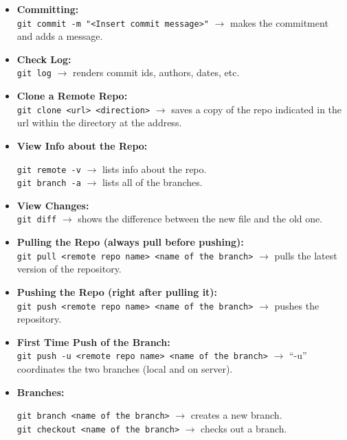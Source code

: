 \documentclass{article}
\begin{document}
\begin{itemize}
    	\item \textbf{Committing:}\\
    	    {\tt git commit -m "<Insert commit message>"} $\rightarrow$ makes the commitment and adds a message.
    	
    	\item \textbf{Check Log:}\\
    	    {\tt git log} $\rightarrow$ renders commit ids, authors, dates, etc.
    	    
    	\item \textbf{Clone a Remote Repo:}\\
    	    {\tt git clone <url> <direction>} $\rightarrow$ saves a copy of the repo indicated in the url within the directory at the address.
    	    
    	\item \textbf{View Info about the Repo:}\\
    	    \begin{doublespace}
    	    	{\tt git remote -v} $\rightarrow$ lists info about the repo.\\
    		    {\tt git branch -a} $\rightarrow$ lists all of the branches.
    	    \end{doublespace}
        
        \item \textbf{View Changes:}\\
            {\tt git diff} $\rightarrow$ shows the difference between the new file and the old one.
            
        \item \textbf{Pulling the Repo (always pull before pushing):}\\
            {\tt git pull <remote repo name> <name of the branch>} $\rightarrow$ pulls the latest version of the repository.
        
        \item \textbf{Pushing the Repo (right after pulling it):}\\
            {\tt git push <remote repo name> <name of the branch>} $\rightarrow$ pushes the repository.
            
        \item \textbf{First Time Push of the Branch:}\\
            {\tt git push -u <remote repo name> <name of the branch>} $\rightarrow$ ``-u'' coordinates the two branches (local and on server).
            	
        \item \textbf{Branches:}\\
            \begin{doublespace}
                {\tt git branch <name of the branch>} $\rightarrow$ creates a new branch.\\
                {\tt git checkout <name of the branch>} $\rightarrow$ checks out a branch.
    	    \end{doublespace}
    \end{itemize}
\end{document}
